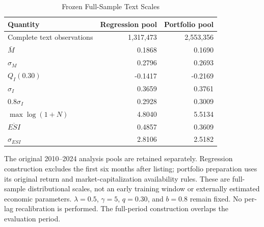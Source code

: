 \begin{table}[H]
\centering\footnotesize
\caption{Frozen Full-Sample Text Scales}\label{tab:parameters}
\begin{threeparttable}
\renewcommand{\arraystretch}{1.12}
\begin{tabular*}{\textwidth}{@{\extracolsep{\fill}}lrr@{}}
\toprule
Quantity & Regression pool & Portfolio pool \\
\midrule
Complete text observations & 1,317,473 & 2,553,356 \\
$\bar M$ & 0.1868 & 0.1690 \\
$\sigma_M$ & 0.2796 & 0.2693 \\
$Q_I(0.30)$ & -0.1417 & -0.2169 \\
$\sigma_I$ & 0.3659 & 0.3761 \\
$0.8\sigma_I$ & 0.2928 & 0.3009 \\
$\max\log(1+N)$ & 4.8040 & 5.5134 \\
$\overline{ESI}$ & 0.4857 & 0.3609 \\
$\sigma_{ESI}$ & 2.8106 & 2.5182 \\
\bottomrule
\end{tabular*}
\begin{tablenoteblock}
The original 2010--2024 analysis pools are retained separately. Regression construction excludes the first six months after listing; portfolio preparation uses its original return and market-capitalization availability rules. These are full-sample distributional scales, not an early training window or externally estimated economic parameters. $\lambda=0.5$, $\gamma=5$, $q=0.30$, and $b=0.8$ remain fixed. No per-lag recalibration is performed. The full-period construction overlaps the evaluation period.
\end{tablenoteblock}
\end{threeparttable}
\end{table}

